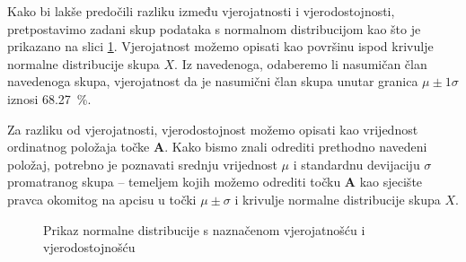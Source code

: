\documentclass[a4paper,12pt,oneside]{memoir}
\begin{document}
                Kako bi lakše predočili razliku između vjerojatnosti i vjerodostojnosti, pretpostavimo zadani skup podataka s normalnom distribucijom kao što je prikazano na slici \ref{fig:31}. Vjerojatnost možemo opisati kao površinu ispod krivulje normalne distribucije skupa $X$. Iz navedenoga, odaberemo li nasumičan član navedenoga skupa, vjerojatnost da je nasumični član skupa unutar granica $\mu\pm1\sigma$ iznosi \SI{68.27}{\percent}.
                
                Za razliku od vjerojatnosti, vjerodostojnost možemo opisati kao vrijednost ordinatnog položaja točke $\mathbf{A}$. Kako bismo znali odrediti prethodno navedeni položaj, potrebno je poznavati srednju vrijednost $\mu$ i standardnu devijaciju $\sigma$ promatranog skupa -- temeljem kojih možemo odrediti točku $\mathbf{A}$ kao sjecište pravca okomitog na apcisu u točki $\mu\pm\sigma$ i krivulje normalne distribucije skupa $X$.

                \begin{figure}[H]
                    \centering
                    \caption{Prikaz normalne distribucije s naznačenom vjerojatnošću i vjerodostojnošću}
                    \label{fig:31}
                \end{figure}
                
\end{document}

